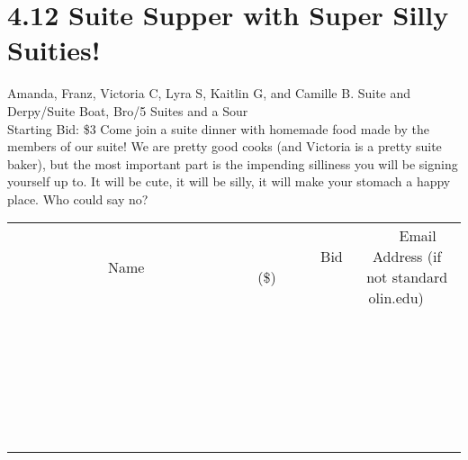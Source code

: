 \documentclass[11pt]{article}
\begin{document}
\section*{4.12 Suite Supper with Super Silly Suities!}
Amanda, Franz, Victoria C, Lyra S, Kaitlin G, and Camille B. Suite and Derpy/Suite Boat, Bro/5 Suites and a Sour
\\
Starting Bid: \$3
\newline
Come join a suite dinner with homemade food made by the members of our suite! We are pretty good cooks (and Victoria is a pretty suite baker), but the most important part is the impending silliness you will be signing yourself up to. It will be cute, it will be silly, it will make your stomach a happy place. Who could say no?
\\[6ex]
\begin{tabular}{c c c}
~~~~~~~~~~~~~Name~~~~~~~~~~~~~ & ~~~~~~~~~Bid (\$)~~~~~~~~~  & ~~~Email Address (if not standard olin.edu)~~~\\
 & & \\
\hline
 & & \\
\hline
 & & \\
\hline
 & & \\
\hline
 & & \\
\hline
 & & \\
\hline
 & & \\
\hline
 & & \\
\hline
 & & \\
\hline
 & & \\
\hline
 & & \\
\hline
 & & \\
\hline
 & & \\
\hline
 & & \\
\hline
 & & \\
\hline
 & & \\
\hline
 & & \\
\hline
 & & \\
\hline
 & & \\
\hline
 & & \\
\hline
 & & \\
\hline
 & & \\
\hline
 & & \\
\hline
 & & \\
\hline
 & & \\
\hline
 & & \\
\hline
\end{tabular}
\newpage
\end{document}

